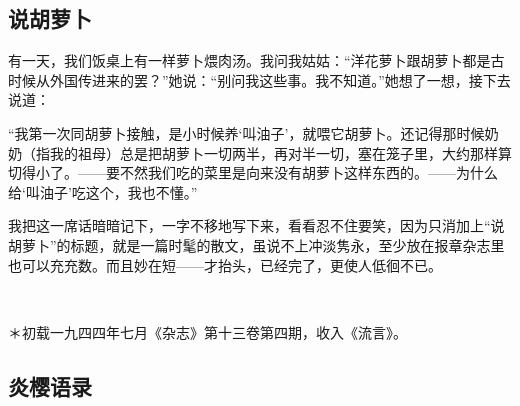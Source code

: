 \subsection{说胡萝卜}

\par 有一天，我们饭桌上有一样萝卜煨肉汤。我问我姑姑：“洋花萝卜跟胡萝卜都是古时候从外国传进来的罢？”她说：“别问我这些事。我不知道。”她想了一想，接下去说道：
\par “我第一次同胡萝卜接触，是小时候养‘叫油子’，就喂它胡萝卜。还记得那时候奶奶（指我的祖母）总是把胡萝卜一切两半，再对半一切，塞在笼子里，大约那样算切得小了。——要不然我们吃的菜里是向来没有胡萝卜这样东西的。——为什么给‘叫油子’吃这个，我也不懂。”
\par 我把这一席话暗暗记下，一字不移地写下来，看看忍不住要笑，因为只消加上“说胡萝卜”的标题，就是一篇时髦的散文，虽说不上冲淡隽永，至少放在报章杂志里也可以充充数。而且妙在短——才抬头，已经完了，更使人低徊不已。
\par  
\par ＊初载一九四四年七月《杂志》第十三卷第四期，收入《流言》。


\subsection{炎樱语录}

